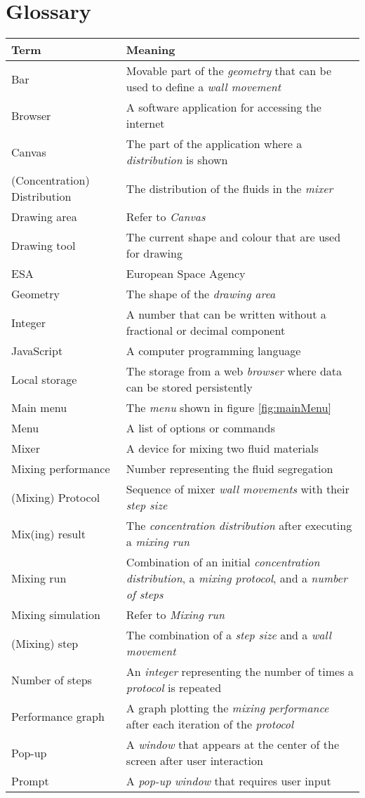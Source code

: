 \chapter{Glossary}
\begin{tabularx}{\textwidth}{lX}
    \toprule
    \textbf{Term} & \textbf{Meaning} \\
    \midrule
    Bar & Movable part of the \emph{geometry} that can be used to define a \emph{wall movement} \\
    Browser & A software application for accessing the internet \\
    Canvas & The part of the application where a \emph{distribution} is shown \\
    (Concentration) Distribution & The distribution of the fluids in the \emph{mixer} \\
    Drawing area & Refer to \emph{Canvas}\\
    Drawing tool & The current shape and colour that are used for drawing\\
    ESA & European Space Agency \\
    Geometry & The shape of the \emph{drawing area} \\
    Integer & A number that can be written without a fractional or decimal component \\
    JavaScript & A computer programming language \\
    Local storage & The storage from a web \emph{browser} where data can be stored persistently\\
    Main menu & The \emph{menu} shown in figure \ref{fig:mainMenu}\\
    Menu & A list of options or commands \\
    Mixer & A device for mixing two fluid materials \\ 
    Mixing performance & Number representing the fluid segregation \\
    (Mixing) Protocol & Sequence of mixer \emph{wall movements} with their \emph{step size} \\
    Mix(ing) result & The \emph{concentration distribution} after executing a \emph{mixing run} \\
    Mixing run & Combination of an initial \emph{concentration distribution}, a \emph{mixing protocol}, and a \emph{number of steps} \\
    Mixing simulation & Refer to \emph{Mixing run}\\
    (Mixing) step & The combination of a \emph{step size} and a \emph{wall movement} \\
    Number of steps & An \emph{integer} representing the number of times a \emph{protocol} is repeated \\
    Performance graph & A graph plotting the \emph{mixing performance} after each iteration of the \emph{protocol} \\
    Pop-up & A \emph{window} that appears at the center of the screen after user interaction \\
    Prompt & A \emph{pop-up} \emph{window} that requires user input \\
        \bottomrule
\end{tabularx}

